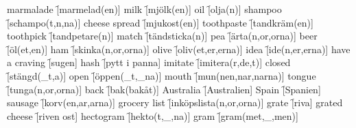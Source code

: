 \begin{questions}
\begin{multicols}{2}
        \question marmalade \f[marmelad(en)]
        \question milk \f[mjölk(en)]
        \question oil \f[olja(n)]
        \question shampoo \f[schampo(t,n,na)]
        \question cheese spread \f[mjukost(en)]
        \question toothpaste  \f[tandkräm(en)]
        \question toothpick \f[tandpetare(n)]
        \question match \f[tändsticka(n)]
        \question pea \f[ärta(n,or,orna)]
        \question beer \f[öl(et,en)]
        \question ham \f[skinka(n,or,orna)]
        \question olive \f[oliv(et,er,erna)]
        \question idea \f[ide(n,er,erna)]
        \question have a craving \f[sugen]
        \question hash \f[pytt i panna]
        \question imitate \f[imitera(r,de,t)]
        \question closed \f[stängd(\_t,a)]
        \question open \f[öppen(\_t,\_na)]
        \question mouth \f[mun(nen,nar,narna)]
        \question tongue \f[tunga(n,or,orna)]
        \question back \f[bak(bakåt)]
        \question Australia \f[Australien]
        \question Spain \f[Spanien]
        \question sausage \f[korv(en,ar,arna)]
        \question grocery list \f[inköpslista(n,or,orna)]
        \question grate \f[riva]
        \question grated cheese \f[riven ost]
        \question hectogram \f[hekto(t,\_,na)]
        \question gram \f[gram(met,\_,men)]
    \end{multicols}
\end{questions}
